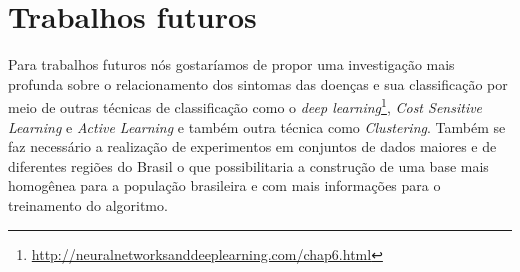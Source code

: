 \section{Trabalhos futuros}

Para trabalhos futuros nós gostaríamos de propor uma investigação mais profunda sobre o relacionamento dos sintomas das doenças e sua classificação por meio de outras técnicas de classificação como o \textit{deep learning}\footnote{\url{http://neuralnetworksanddeeplearning.com/chap6.html}}, \textit{Cost Sensitive Learning} e \textit{Active Learning} \cite{krishnamurthy2017active} e também outra técnica como \textit{Clustering}. Também se faz necessário a realização de experimentos em conjuntos de dados maiores e de diferentes regiões do Brasil o que possibilitaria a construção de uma base mais homogênea para a população brasileira e com mais informações para o treinamento do algoritmo.